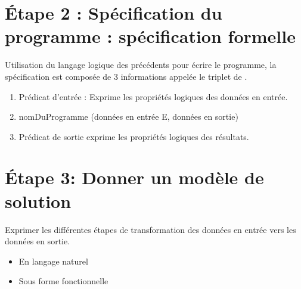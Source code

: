 \documentclass[12pt,a4paper,openany]{book}
\begin{document}
		\section{\'Etape 2 : Spécification du programme : spécification formelle}
		Utilisation du langage logique des précédents pour écrire le programme, la spécification est composée de 3 informations appelée le triplet de .
			\begin{enumerate}
				\item Prédicat d'entrée : Exprime les propriétés logiques des données en entrée. 
				\item nomDuProgramme (données en entrée E, données en sortie) 
				\item Prédicat de sortie exprime les propriétés logiques des résultats.
			\end{enumerate}
			\section{\'Etape 3: Donner un modèle de solution}
			Exprimer les différentes étapes de transformation des données en entrée vers les données en sortie. 
			\begin{itemize}
				\item En langage naturel
				\item Sous forme fonctionnelle
			\end{itemize}
\end{document}
